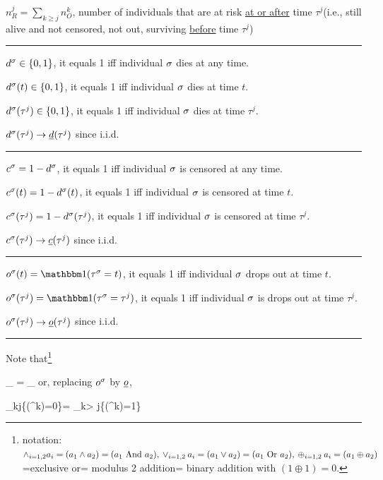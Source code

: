 $n_R^j=\sum_{k\geq j}n_O^k$, number of individuals
that are at risk \ul{at or after} time $\tau^j$(i.e.,  still alive
and not censored, not out, surviving \ul{before} time $\tau^j$)

\hrule
$d^\sigma\in\{0,1\}$, it equals 1 iff individual
$\sigma$ dies at any time.

$d^\sigma(t)\in\{0,1\}$, it  equals  1 iff individual
$\sigma$ dies at time $t$.

$d^\sigma(\tau^j)\in\{0,1\}$, it  equals  1 iff individual
$\sigma$ dies at time $\tau^j$.

$d^\sigma(\tau^j)\rightarrow {\underline{d}}(\tau^j)$ since i.i.d.
\hrule
$c^\sigma=1-d^\sigma$, it equals 1 iff individual
$\sigma$ is censored  at any time.

$c^\sigma(t)=1-d^\sigma(t)$, it  equals  1 iff individual
$\sigma$ is censored at time $t$.

$c^\sigma(\tau^j)=1-d^\sigma(\tau^j)$, it  equals  1 iff individual
$\sigma$ is censored at time $\tau^j$.

$c^\sigma(\tau^j)\rightarrow {\underline{c}}(\tau^j)$ since i.i.d.
\hrule

$o^\s(t)=\indi(\tau^\s = t)$, it  equals  1 iff individual
$\sigma$ drops out at time $t$.

$o^\s(\tau^j)=\indi(\tau^\s = \tau^j)$, it  equals  1 iff individual
$\sigma$ is drops out at time $\tau^j$.

$o^\sigma(\tau^j)\rightarrow {\underline{o}}(\tau^j)$ since i.i.d.
\hrule
Note that\footnote{
notation: $
\wedge_{i=1,2}a_i = (a_1 \wedge a_2)= (a_1
\text{ And } a_2),\\
\vee_{i=1,2}a_i = (a_1 \vee  a_2 )= (a_1
\text{ Or } a_2),\\
\oplus_{i=1,2}a_i = (a_1 \oplus a_2)$ =exclusive or=
modulus 2 addition=
binary addition with $(1\oplus 1)=0$.}

\beq
{}_{ }=
_{ }
\eeq
or, replacing $o^\sigma$ by ${\underline{o}}$,

\beq
\bigA_{k\leq j}\{\rvo(\tau^k)=0\}=
\bigxor_{k> j}\{\rvo(\tau^k)=1\}
\eeq




